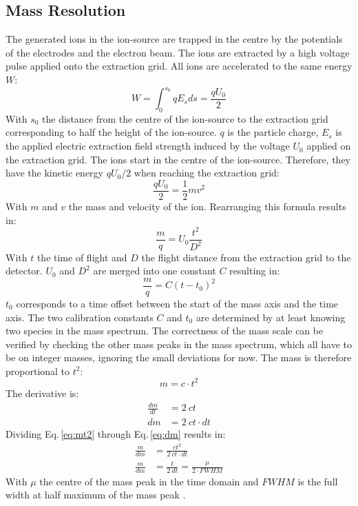 	\subsection{Mass Resolution }\label{chap:massRes}
	The generated ions in the ion-source are trapped in the centre by the potentials of the electrodes and the electron beam. The ions are extracted by a high voltage pulse applied onto the extraction grid. All ions are accelerated to the same energy $W$:
	\begin{equation}
		W = \int_{0}^{s_0}q E_s ds =  \frac{q U_0}{2}
		\label{eq:WIonPulse}
	\end{equation}
	With $s_0$ the distance from the centre of the ion-source to the extraction grid corresponding to half the height of the ion-source. $q$ is the particle charge, $E_s$ is the applied electric extraction field strength induced by the voltage $U_0$ applied on the extraction grid. The ions start in the centre of the ion-source. Therefore, they have the kinetic energy $q U_0/2$ when reaching the extraction grid:
	\begin{equation}
		\frac{q U_0}{2} = \frac{1}{2}m v^2
	\end{equation}
	With $m$ and $v$ the mass and velocity of the ion. Rearranging this formula results in:
	\begin{equation}
		\frac{m}{q} = U_0\frac{t^2}{D^2}
		\label{eq:m/q}
	\end{equation}
	With $t$ the time of flight and $D$ the flight distance from the extraction grid to the detector. $U_0$ and $D^2$ are merged into one constant $C$ resulting in:
	\begin{equation}
		\frac{m}{q} = C(t-t_0)^2
		\label{eq:mass_Calib}
	\end{equation}
	$t_0$ corresponds to a time offset between the start of the mass axis and the time axis. The two calibration constants $C$ and $t_0$ are determined by at least knowing two species in the mass spectrum. The correctness of the mass scale can be verified by checking the other mass peaks in the mass spectrum, which all have to be on integer masses, ignoring the small deviations for now. The mass is therefore proportional to $t^2$:
	\begin{equation}
		m = c\cdot t^2
		\label{eq:mt2}
	\end{equation}
	The derivative is:
	\begin{align}
		\frac{dm}{dt} &= 2~ct\\
		dm &= 2~ct\cdot dt
		\label{eq:dm}
	\end{align}
	Dividing Eq.\,\eqref{eq:mt2} through Eq.\,\eqref{eq:dm} results in:
	\begin{align}
		\frac{m}{dm} &= \frac{ct^2}{2~ct\cdot dt}\\
		\frac{m}{dm} &= \frac{t}{2~dt} = \frac{\mu}{2\cdot FWHM}
		\label{eq:massRes}
	\end{align}
	With $\mu$ the centre of the mass peak in the time domain and $FWHM$ is the full width at half maximum of the mass peak \cite{LecNot_Wurz2017}.
	\\
	
